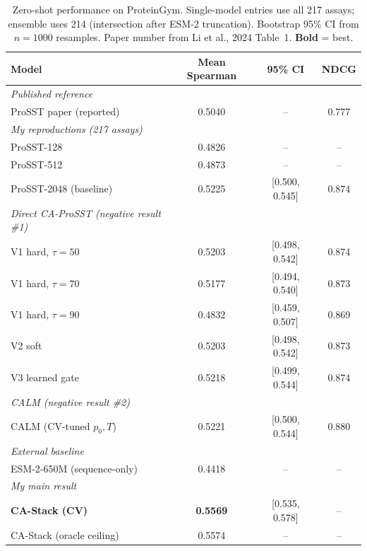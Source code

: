 \documentclass[11pt,a4paper]{article}
\begin{document}
\begin{table}[h]
\centering
\caption{Zero-shot performance on ProteinGym. Single-model entries use
all 217 assays; ensemble uses 214 (intersection after ESM-2 truncation).
Bootstrap 95\% CI from $n{=}1000$ resamples. Paper number from
Li et al., 2024 Table~1. \textbf{Bold} = best.}
\label{tab:main}
\begin{tabular}{lccc}
\toprule
Model & Mean Spearman & 95\% CI & NDCG \\
\midrule
\textit{Published reference} \\
\quad ProSST paper (reported)          & 0.5040 & --               & 0.777 \\
\textit{My reproductions (217 assays)} \\
\quad ProSST-128                        & 0.4826 & --               & -- \\
\quad ProSST-512                        & 0.4873 & --               & -- \\
\quad ProSST-2048 (baseline)            & 0.5225 & [0.500, 0.545]   & 0.874 \\
\textit{Direct CA-ProSST (negative result \#1)} \\
\quad V1 hard, $\tau{=}50$              & 0.5203 & [0.498, 0.542]   & 0.874 \\
\quad V1 hard, $\tau{=}70$              & 0.5177 & [0.494, 0.540]   & 0.873 \\
\quad V1 hard, $\tau{=}90$              & 0.4832 & [0.459, 0.507]   & 0.869 \\
\quad V2 soft                           & 0.5203 & [0.498, 0.542]   & 0.873 \\
\quad V3 learned gate                   & 0.5218 & [0.499, 0.544]   & 0.874 \\
\textit{CALM (negative result \#2)} \\
\quad CALM (CV-tuned $p_0, T$)         & 0.5221 & [0.500, 0.544]   & 0.880 \\
\textit{External baseline} \\
\quad ESM-2-650M (sequence-only)        & 0.4418 & --               & -- \\
\midrule
\textit{My main result} \\
\quad \textbf{CA-Stack (CV)}            & \textbf{0.5569} & [0.535, 0.578] & -- \\
\quad CA-Stack (oracle ceiling)         & 0.5574 & --               & -- \\
\bottomrule
\end{tabular}
\end{table}
\end{document}
